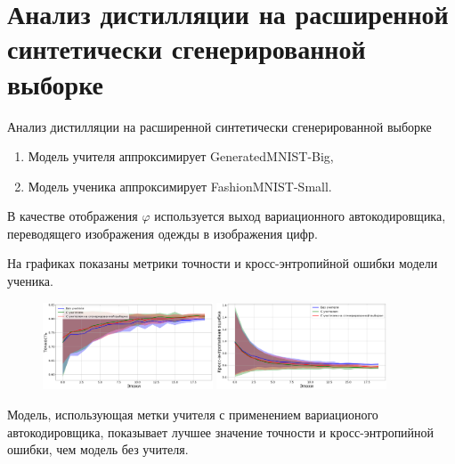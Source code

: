 \documentclass[10pt,pdf,hyperref={unicode}]{beamer}
\begin{document}
\section{Анализ дистилляции на расширенной синтетически сгенерированной выборке}
\begin{frame}{Анализ дистилляции на расширенной синтетически сгенерированной выборке}
\justifying
\begin{enumerate}[1)]
    \item Модель учителя аппроксимирует GeneratedMNIST-Big,
    \item Модель ученика аппроксимирует FashionMNIST-Small.
\end{enumerate}

\par
В качестве отображения $\varphi$ используется выход вариационного автокодировщика, переводящего изображения одежды в изображения цифр.

На графиках показаны метрики точности и кросс-энтропийной ошибки модели ученика.

\begin{figure}[h!]
\includegraphics[width=0.45\textwidth]{results/ext_mnist_acc.png}
\includegraphics[width=0.45\textwidth]{results/ext_mnist_loss.png}
\end{figure}

Модель, использующая метки учителя с применением вариационого автокодировщика, показывает лучшее значение точности и кросс-энтропийной ошибки, чем модель без учителя.

\end{frame}

\end{document}
